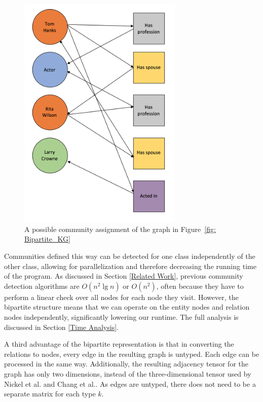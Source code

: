 \documentclass[12pt]{article}
\begin{document}
\begin{figure}
    \centering
    \includegraphics[width=0.7\textwidth,keepaspectratio]{figures/Colored_Bipartite_KG.png}
    \caption{A possible community assignment of the graph in Figure~\ref{fig: Bipartite_KG} }
    \label{fig: Colored_Bipartite_KG}
\end{figure}

Communities defined this way can be detected for one class independently of the
other class, allowing for parallelization and therefore decreasing the running
time of the program. As discussed in Section \ref{Related Work}, previous
community detection algorithms are $O(n^2\lg n)$ or $O(n^2)$, often because they
have to perform a linear check over all nodes for each node they visit. However,
the bipartite structure means that we can operate on the entity nodes and
relation nodes independently, significantly lowering our runtime. The full
analysis is discussed in Section \ref{Time Analysis}.

A third advantage of the bipartite representation is that in converting the
relations to nodes, every edge in the resulting graph is untyped. Each edge can
be processed in the same way. Additionally, the resulting adjacency tensor for
the graph has only two dimensions, instead of the three-dimensional tensor used
by Nickel et al.\cite{Nickel2011} and Chang et al.\cite{Chang2011}. As edges
are untyped, there does not need to be a separate matrix for each type $k$.
\end{document}

